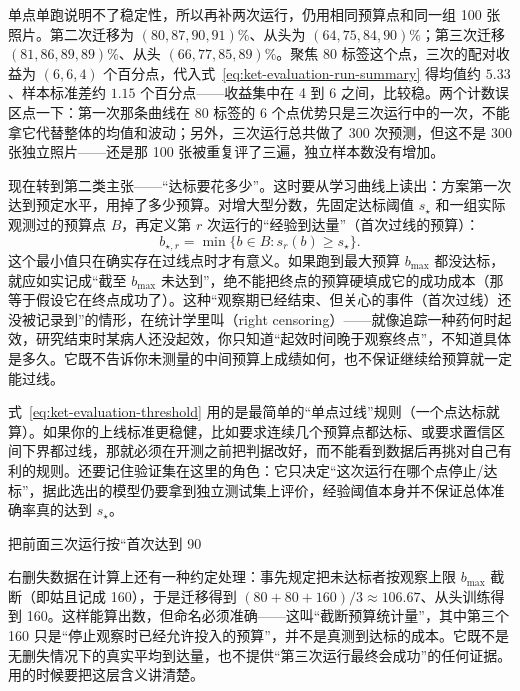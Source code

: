单点单跑说明不了稳定性，所以再补两次运行，仍用相同预算点和同一组 100 张照片。第二次迁移为 $(80,87,90,91)\%$、从头为 $(64,75,84,90)\%$；第三次迁移 $(81,86,89,89)\%$、从头 $(66,77,85,89)\%$。聚焦 80 标签这个点，三次的配对收益为 $(6,6,4)$ 个百分点，代入式~\eqref{eq:ket-evaluation-run-summary} 得均值约 $5.33$、样本标准差约 $1.15$ 个百分点——收益集中在 4 到 6 之间，比较稳。两个计数误区点一下：第一次那条曲线在 80 标签的 6 个点优势只是三次运行中的一次，不能拿它代替整体的均值和波动；另外，三次运行总共做了 300 次预测，但这不是 300 张独立照片——还是那 100 张被重复评了三遍，独立样本数没有增加。

现在转到第二类主张——“达标要花多少”。这时要从学习曲线上读出：方案第一次达到预定水平，用掉了多少预算。对增大型分数，先固定达标阈值 $s_\star$ 和一组实际观测过的预算点 $B$，再定义第 $r$ 次运行的“经验到达量”（首次过线的预算）：
\begin{equation}
  b_{\star,r}=\min\{b\in B:s_r(b)\geq s_\star\}.
  \label{eq:ket-evaluation-threshold}
\end{equation}
这个最小值只在确实存在过线点时才有意义。如果跑到最大预算 $b_{\max}$ 都没达标，就应如实记成“截至 $b_{\max}$ 未达到”，绝不能把终点的预算硬填成它的成功成本（那等于假设它在终点成功了）。这种“观察期已经结束、但关心的事件（首次过线）还没被记录到”的情形，在统计学里叫（right censoring）——就像追踪一种药何时起效，研究结束时某病人还没起效，你只知道“起效时间晚于观察终点”，不知道具体是多久。它既不告诉你未测量的中间预算上成绩如何，也不保证继续给预算就一定能过线。

式~\eqref{eq:ket-evaluation-threshold} 用的是最简单的“单点过线”规则（一个点达标就算）。如果你的上线标准更稳健，比如要求连续几个预算点都达标、或要求置信区间下界都过线，那就必须在开测之前把判据改好，而不能看到数据后再挑对自己有利的规则。还要记住验证集在这里的角色：它只决定“这次运行在哪个点停止/达标”，据此选出的模型仍要拿到独立测试集上评价，经验阈值本身并不保证总体准确率真的达到 $s_\star$。

把前面三次运行按“首次达到 90%

右删失数据在计算上还有一种约定处理：事先规定把未达标者按观察上限 $b_{\max}$ 截断（即姑且记成 160），于是迁移得到 $(80+80+160)/3\approx106.67$、从头训练得到 160。这样能算出数，但命名必须准确——这叫“截断预算统计量”，其中第三个 160 只是“停止观察时已经允许投入的预算”，并不是真测到达标的成本。它既不是无删失情况下的真实平均到达量，也不提供“第三次运行最终会成功”的任何证据。用的时候要把这层含义讲清楚。

